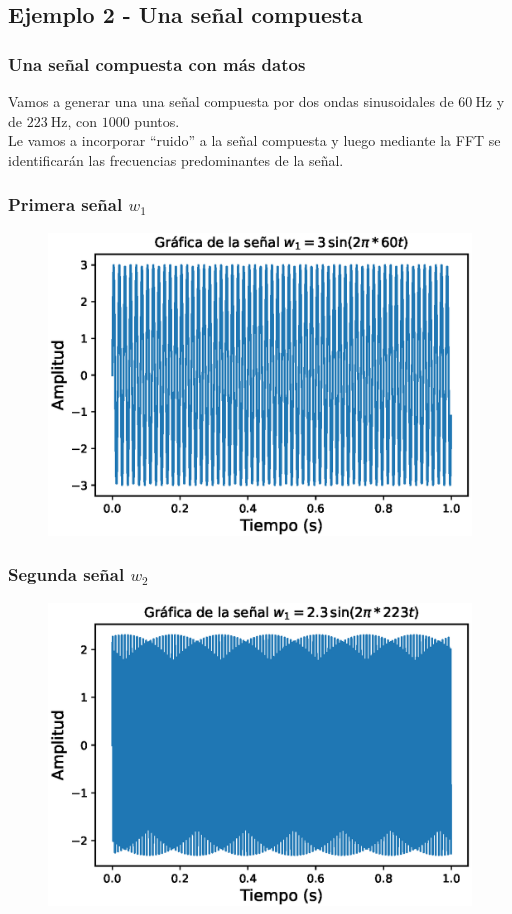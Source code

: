 \documentclass[12pt]{beamer}
\begin{document}
\subsection{Ejemplo 2 - Una señal compuesta}
\begin{frame}
\frametitle{Una señal compuesta con más datos}
Vamos a generar una una señal compuesta por dos ondas sinusoidales de $\SI{60}{\hertz}$ y de $\SI{223}{\hertz}$, con $1000$ puntos.
\\
\bigskip
\pause
Le vamos a incorporar \enquote{ruido} a la señal compuesta y luego mediante la FFT se identificarán las frecuencias predominantes de la señal.
\end{frame}
\begin{frame}
\frametitle{Primera señal $w_{1}$}
\begin{figure}
    \centering
    \includegraphics[scale=0.65]{Imagenes/DFT_Analisis_Senal_01.eps}
\end{figure}
\end{frame}
\begin{frame}
\frametitle{Segunda señal $w_{2}$}
\begin{figure}
    \centering
    \includegraphics[scale=0.65]{Imagenes/DFT_Analisis_Senal_02.eps}
\end{figure}
\end{frame}
\end{document}
